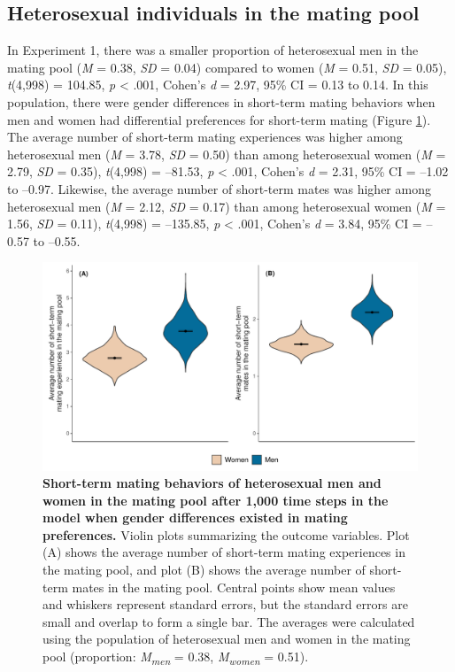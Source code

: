 \documentclass[
  11pt,
]{article}
\begin{document}
\hypertarget{heterosexual-individuals-in-the-mating-pool}{%
\subsection{Heterosexual individuals in the mating
pool}\label{heterosexual-individuals-in-the-mating-pool}}

In Experiment 1, there was a smaller proportion of heterosexual men in
the mating pool (\emph{M} = 0.38, \emph{SD} = 0.04) compared to women
(\emph{M} = 0.51, \emph{SD} = 0.05), \emph{t}(4,998) = 104.85, \emph{p}
\textless{} .001, Cohen's \emph{d} = 2.97, 95\% CI = 0.13 to 0.14. In
this population, there were gender differences in short-term mating
behaviors when men and women had differential preferences for short-term
mating (Figure \ref{fig:men_vs_women_inpool}). The average number of
short-term mating experiences was higher among heterosexual men
(\emph{M} = 3.78, \emph{SD} = 0.50) than among heterosexual women
(\emph{M} = 2.79, \emph{SD} = 0.35), \emph{t}(4,998) = --81.53, \emph{p}
\textless{} .001, Cohen's \emph{d} = 2.31, 95\% CI = --1.02 to --0.97.
Likewise, the average number of short-term mates was higher among
heterosexual men (\emph{M} = 2.12, \emph{SD} = 0.17) than among
heterosexual women (\emph{M} = 1.56, \emph{SD} = 0.11), \emph{t}(4,998)
= --135.85, \emph{p} \textless{} .001, Cohen's \emph{d} = 3.84, 95\% CI
= --0.57 to --0.55.

\begin{figure}[h]
  \centering
  \includegraphics[width=0.8\columnwidth]{figures/fig2_men_vs_women_inpool.pdf}
  \caption{\textbf{Short-term mating behaviors of heterosexual men and women in the mating pool after 1,000 time steps in the model when gender differences existed in mating preferences.} Violin plots summarizing the outcome variables. Plot (A) shows the average number of short-term mating experiences in the mating pool, and plot (B) shows the average number of short-term mates in the mating pool. Central points show mean values and whiskers represent standard errors, but the standard errors are small and overlap to form a single bar. The averages were calculated using the population of heterosexual men and women in the mating pool (proportion: \textit{M\textsubscript{men}} = 0.38, \textit{M\textsubscript{women}} = 0.51).}
  \label{fig:men_vs_women_inpool}
\end{figure}
\end{document}

